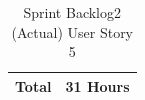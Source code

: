 \documentclass[12pt]{report}
\begin{document}
\begin{table}[h]
{\begin{tabular}{|cc|cccccccc|}
\multicolumn{2}{|c|}{\textbf{Total}}                                                                                                                                                  & \multicolumn{8}{c|}{31   Hours}                                                                                                                                                                                                                                                                                                                                                                                                                                                                                                                                                                                                                                                                                                                                                                                                                                                                                            \\ \hline
\end{tabular}
}
\caption{Sprint Backlog2 (Actual) User Story 5}
\label{tab:mytable}
\end{table}
\end{document}

